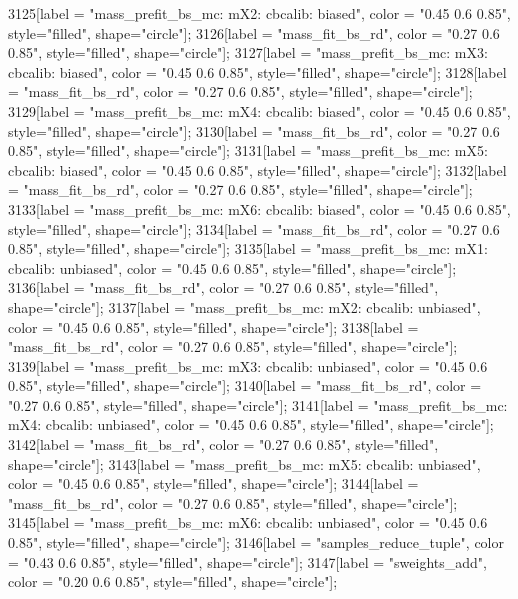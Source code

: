 {	3125[label = "mass_prefit_bs_mc\nmassbin: mX2\nmassmodel: cbcalib\ntrigger: biased", color = "0.45 0.6 0.85", style="filled", shape="circle"];
	3126[label = "mass_fit_bs_rd", color = "0.27 0.6 0.85", style="filled", shape="circle"];
	3127[label = "mass_prefit_bs_mc\nmassbin: mX3\nmassmodel: cbcalib\ntrigger: biased", color = "0.45 0.6 0.85", style="filled", shape="circle"];
	3128[label = "mass_fit_bs_rd", color = "0.27 0.6 0.85", style="filled", shape="circle"];
	3129[label = "mass_prefit_bs_mc\nmassbin: mX4\nmassmodel: cbcalib\ntrigger: biased", color = "0.45 0.6 0.85", style="filled", shape="circle"];
	3130[label = "mass_fit_bs_rd", color = "0.27 0.6 0.85", style="filled", shape="circle"];
	3131[label = "mass_prefit_bs_mc\nmassbin: mX5\nmassmodel: cbcalib\ntrigger: biased", color = "0.45 0.6 0.85", style="filled", shape="circle"];
	3132[label = "mass_fit_bs_rd", color = "0.27 0.6 0.85", style="filled", shape="circle"];
	3133[label = "mass_prefit_bs_mc\nmassbin: mX6\nmassmodel: cbcalib\ntrigger: biased", color = "0.45 0.6 0.85", style="filled", shape="circle"];
	3134[label = "mass_fit_bs_rd", color = "0.27 0.6 0.85", style="filled", shape="circle"];
	3135[label = "mass_prefit_bs_mc\nmassbin: mX1\nmassmodel: cbcalib\ntrigger: unbiased", color = "0.45 0.6 0.85", style="filled", shape="circle"];
	3136[label = "mass_fit_bs_rd", color = "0.27 0.6 0.85", style="filled", shape="circle"];
	3137[label = "mass_prefit_bs_mc\nmassbin: mX2\nmassmodel: cbcalib\ntrigger: unbiased", color = "0.45 0.6 0.85", style="filled", shape="circle"];
	3138[label = "mass_fit_bs_rd", color = "0.27 0.6 0.85", style="filled", shape="circle"];
	3139[label = "mass_prefit_bs_mc\nmassbin: mX3\nmassmodel: cbcalib\ntrigger: unbiased", color = "0.45 0.6 0.85", style="filled", shape="circle"];
	3140[label = "mass_fit_bs_rd", color = "0.27 0.6 0.85", style="filled", shape="circle"];
	3141[label = "mass_prefit_bs_mc\nmassbin: mX4\nmassmodel: cbcalib\ntrigger: unbiased", color = "0.45 0.6 0.85", style="filled", shape="circle"];
	3142[label = "mass_fit_bs_rd", color = "0.27 0.6 0.85", style="filled", shape="circle"];
	3143[label = "mass_prefit_bs_mc\nmassbin: mX5\nmassmodel: cbcalib\ntrigger: unbiased", color = "0.45 0.6 0.85", style="filled", shape="circle"];
	3144[label = "mass_fit_bs_rd", color = "0.27 0.6 0.85", style="filled", shape="circle"];
	3145[label = "mass_prefit_bs_mc\nmassbin: mX6\nmassmodel: cbcalib\ntrigger: unbiased", color = "0.45 0.6 0.85", style="filled", shape="circle"];
	3146[label = "samples_reduce_tuple", color = "0.43 0.6 0.85", style="filled", shape="circle"];
	3147[label = "sweights_add", color = "0.20 0.6 0.85", style="filled", shape="circle"];
}
